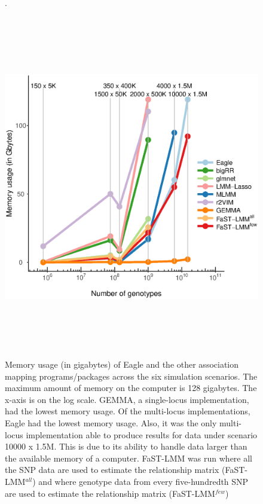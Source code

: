\documentclass{article}
\begin{document}
\begin{figure}
\caption{Memory usage (in gigabytes) of Eagle and the other association mapping programs/packages across 
the six simulation scenarios. The maximum amount of memory on the computer is 128 gigabytes. 
The x-axis is on the log scale. GEMMA, a single-locus implementation, had the lowest memory usage. 
Of the multi-locus implementations, Eagle had the lowest memory usage. Also, it 
was the only multi-locus 
implementation able to produce results for data under  scenario 10000 x 1.5M. This is due to its ability 
to handle data larger than the available memory of a computer. FaST-LMM was run where all the SNP data are used 
to estimate the relationship matrix (FaST-LMM$^{all}$)   and where genotype data from every five-hundredth SNP are used to 
estimate the relationship matrix (FaST-LMM$^{few}$)}.
\label{supfigmem}

\begin{center}
\includegraphics[width=15cm, height=15cm]{mem.eps}
\end{center}
\end{figure}
\end{document}
